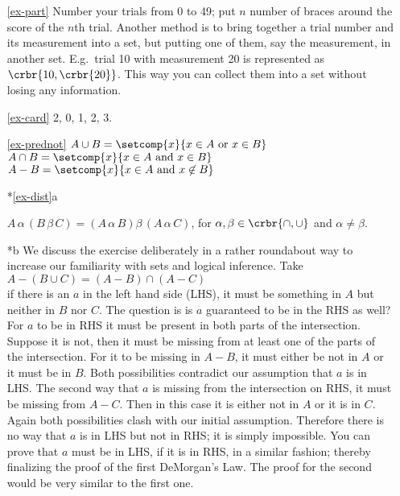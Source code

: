 \documentclass[11pt]{article}
\begin{document}
\begin{itemize}
\item[\ref{ex-part}] Number your trials from 0 to 49; put $n$ number of
braces around the score of the $n$th trial. Another method is to bring together
a trial number and its measurement into a set, but putting one of them, say the
measurement, in another set. E.g.\ trial 10 with measurement 20 is represented
as $\crbr{10,\crbr{20}}$. This way you can collect them into a set without
losing any information.

\item[\ref{ex-card}] 2, 0, 1, 2, 3.

\item[\ref{ex-prednot}] 
$A\cup B = \setcomp{x}{x\in A \text{ or } x \in B}$ \\
$A\cap B = \setcomp{x}{x\in A \text{ and } x \in B} $ \\
$A - B = \setcomp{x}{x\in A \text{ and } x \not\in B}$

\item[*\ref{ex-dist}a]

$A\,\alpha\, (B\, \beta\, C) = (A\,\alpha\, B) \beta\, (A\,\alpha\, C)$, for
$\alpha, \beta \in \crbr{\cap,\cup}$ and $\alpha\neq\beta$.

\item[*b] We discuss the exercise deliberately in a rather
roundabout way to increase our familiarity with sets and logical inference. Take\\
$A - (B\cup C) = (A-B) \cap (A-C)$\\
if there is an $a$ in the left hand side (LHS), it must be something in $A$ but
neither in $B$ nor $C$. The question is is $a$ guaranteed to be in the RHS as
well? For $a$ to be in RHS it must be present in both parts of the intersection.
Suppose it is not, then it must be missing from at least one of the parts of the
intersection. For it to be missing in $A - B$, it must either be not in $A$ or
it must be in $B$. Both possibilities contradict our assumption that $a$ is in
LHS. The second way that $a$ is missing from the intersection on RHS, it must be
missing from $A - C$. Then in this case it is either not in $A$ or it is in $C$.
Again both possibilities clash with our initial assumption. Therefore there is
no way that $a$ is in LHS but not in RHS; it is simply impossible. You can prove
that $a$ must be in LHS, if it is in RHS, in a similar fashion; thereby
finalizing the proof of the first DeMorgan's Law. The proof for the second
would be very similar to the first one. 


\end{itemize}
\end{document}
